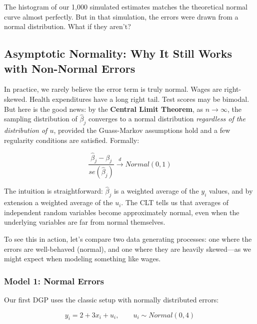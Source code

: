 \documentclass[
  letterpaper,
  DIV=11,
  numbers=noendperiod]{scrreprt}
\begin{document}
The histogram of our 1,000 simulated estimates matches the theoretical
normal curve almost perfectly. But in that simulation, the errors were
drawn from a normal distribution. What if they aren't?

\subsection{Asymptotic Normality: Why It Still Works with Non-Normal
Errors}\label{asymptotic-normality-why-it-still-works-with-non-normal-errors}

In practice, we rarely believe the error term is truly normal. Wages are
right-skewed. Health expenditures have a long right tail. Test scores
may be bimodal. But here is the good news: by the \textbf{Central Limit
Theorem}, as \(n \to \infty\), the sampling distribution of
\(\hat{\beta}_j\) converges to a normal distribution \emph{regardless of
the distribution of \(u\)}, provided the Guass-Markov assumptions hold
and a few regularity conditions are satisfied. Formally:

\[\frac{\hat{\beta}_j - \beta_j}{se(\hat{\beta}_j)} \xrightarrow{d} Normal(0, 1)\]

The intuition is straightforward: \(\hat{\beta}_j\) is a weighted
average of the \(y_i\) values, and by extension a weighted average of
the \(u_i\). The CLT tells us that averages of independent random
variables become approximately normal, even when the underlying
variables are far from normal themselves.

To see this in action, let's compare two data generating processes: one
where the errors are well-behaved (normal), and one where they are
heavily skewed---as we might expect when modeling something like wages.

\subsubsection{Model 1: Normal Errors}\label{model-1-normal-errors}

Our first DGP uses the classic setup with normally distributed errors:

\[y_i = 2 + 3x_i + u_i, \qquad u_i \sim Normal(0, 4)\]
\end{document}
